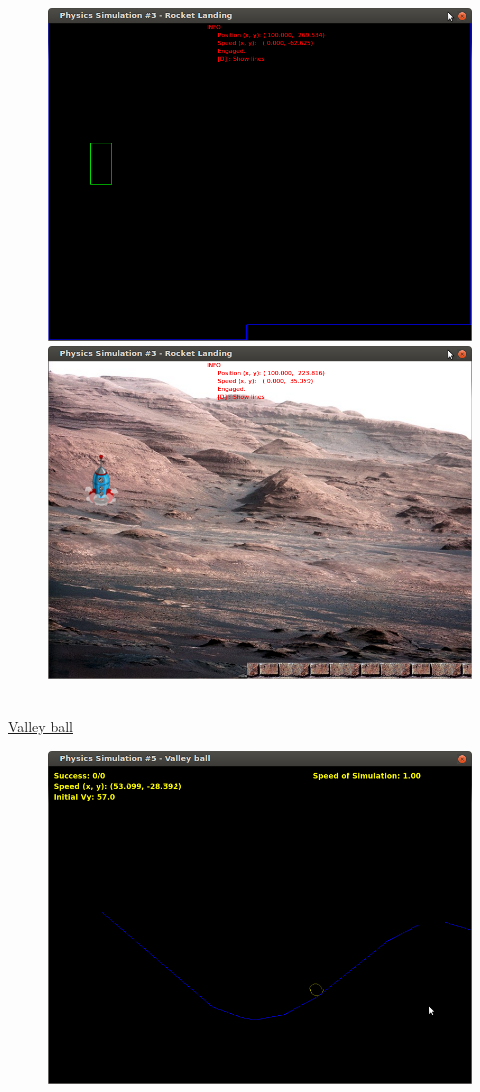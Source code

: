 \documentclass[plainboxedsections]{sciposter}
\begin{document}
\begin{multicols}{2}
\begin{figure}
    \includegraphics[scale=0.6]{lunarLandingE.png}
    \includegraphics[scale=0.6]{lunarLanding.png}
  \end{figure}
  \\[1ex]
  \underline{Valley ball}
  \\[1ex]
  \begin{figure}
    \includegraphics[scale=0.6]{valleyE.png}

\end{figure}
\end{multicols}
\end{document}
